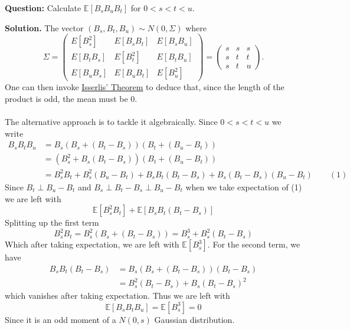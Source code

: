 \documentclass{article}
\begin{document}
\begin{tcolorbox}[colframe=black,colback=gray!5,boxrule=0.5pt]
\textbf{Question:} Calculate $\mathbb{E}[B_sB_uB_t]$ for $0<s<t<u.$
\end{tcolorbox}
\textbf{Solution.} The vector $(B_s, B_t, B_u)\sim N(0,\Sigma)$ where 
\[
\Sigma = \begin{pmatrix}
E[B_s^2] & E[B_s B_t] & E[B_s B_u] \\
E[B_t B_s] & E[B_t^2] & E[B_t B_u] \\
E[B_u B_s] & E[B_u B_t] & E[B_u^2]
\end{pmatrix}
= 
\begin{pmatrix}
s & s & s \\
s & t & t \\
s & t & u
\end{pmatrix}.
\]
One can then invoke \href{https://en.wikipedia.org/wiki/Isserlis%27s_theorem}{Isserlis' Theorem} to deduce that, since the length of the product is odd, the mean must be 0. \\
\\
The alternative approach is to tackle it algebraically. Since $0<s<t<u$ we write
\begin{align*}
    B_sB_tB_u &= B_s(B_s+(B_t-B_s))(B_t+(B_u-B_t)) \\
    &= (B_s^2 + B_s(B_t-B_s))(B_t+(B_u-B_t)) \\
    &= B_s^2B_t + B_s^2(B_u-B_t)+B_sB_t(B_t-B_s) + B_s(B_t-B_s)(B_u-B_t) \quad\quad (1)
\end{align*}
Since $B_t\perp B_u-B_t$ and $B_s \perp B_t-B_s \perp B_u-B_t$ when we take expectation of (1) we are left with
$$\mathbb{E}[B_s^2B_t] + \mathbb{E}[B_s B_t(B_t-B_s)]$$
Splitting up the first term
$$B_s^2B_t = B_s^2 (B_s + (B_t-B_s)) = B_s^3 + B_s^2(B_t-B_s)$$
Which after taking expectation, we are left with $\mathbb{E}[B_s^3].$ For the second term, we have 
\begin{align*}
    B_sB_t(B_t-B_s)&=B_s(B_s+(B_t-B_s))(B_t-B_s) \\
    &=B_s^2(B_t-B_s)+B_s(B_t-B_s)^2
\end{align*}
which vanishes after taking expectation. Thus we are left with 
$$\mathbb{E}[B_sB_tB_u] = \mathbb{E}[B_s^3]=0$$
Since it is an odd moment of a $N(0,s)$ Gaussian distribution.
\end{document}
